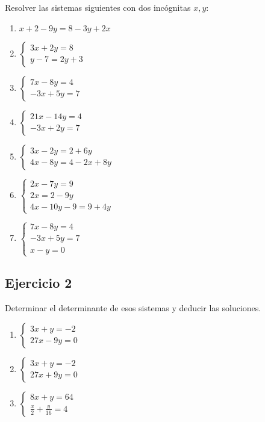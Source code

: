 Resolver las sistemas siguientes con dos incógnitas $x,y$:

\begin{enumerate}
\item $x + 2 - 9y = 8 - 3y + 2x$
\item $\left\{\begin{aligned}
  3x + 2y = 8 \\
  y - 7 = 2y + 3
\end{aligned}\right.$
\item $\left\{\begin{aligned}
   7x  - 8y = 4 \\
  -3x + 5y = 7
\end{aligned}\right.$

\item $\left\{\begin{aligned}
   21x  - 14y = 4 \\
  -3x + 2y = 7
\end{aligned}\right.$

\item $\left\{\begin{aligned}
   3x-2y=2+6y \\
  4x-8y=4-2x+8y
\end{aligned}\right.$

\item $\left\{\begin{aligned}
   2x-7y=9 \\
  2x=2-9y \\
  4x-10y-9=9+4y
\end{aligned}\right.$

\item $\left\{\begin{aligned}
   7x  - 8y = 4 \\
  -3x + 5y = 7 \\
  x - y = 0
\end{aligned}\right.$

\end{enumerate}

\subsection*{Ejercicio 2}

Determinar el determinante de esos sistemas y deducir las soluciones.

\begin{enumerate}
\item $\left\{\begin{aligned}
  3x+y=-2 \\
  27x-9y=0
\end{aligned}\right.$
\item $\left\{\begin{aligned} 3x+y=-2\\ 27x+9y=0\end{aligned}\right.$
\item $\left\{\begin{aligned} 8x+y=64\\ \frac{x}{2}+\frac{y}{16}=4\end{aligned}\right.$
\end{enumerate}

